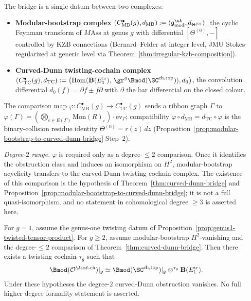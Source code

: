 \begin{remark}
\label{rem:curved-dunn-complex-bridge}
The bridge is a single datum between two complexes:
\begin{itemize}\setlength\itemsep{2pt}
\item \textbf{Modular-bootstrap complex}
 $(C^\bullet_{\mathrm{MB}}(g), d_{\mathrm{MB}})
 := (\mathfrak{g}^{\cA}_{\mathrm{mod}}, d_{\Theta^{(0)}})$,
 the cyclic Feynman transform of $M\mathrm{Ass}$ at genus $g$ with
 differential $[\Theta^{(0)}, -]$ controlled by KZB connections
 (Bernard--Felder at integer level, JMU
 Stokes-regularized at generic level via
 Theorem~\ref{thm:irregular-kzb-composition}).
\item \textbf{Curved-Dunn twisting-cochain complex}
 $(C^\bullet_{\mathrm{TC}}(g), d_{\mathrm{TC}})
 := \bigl(\mathrm{Hom}(\mathbf{B}(E_1^{\mathrm{tr}}),\,
 \gr^g \Bmod(\SC^{\mathrm{ch,top}})), d_0\bigr)$,
 the convolution differential $d_0(f) = \partial f \pm f \partial$
 with $\partial$ the bar differential on the closed colour.
\end{itemize}
The comparison map
$\varphi\colon C^\bullet_{\mathrm{MB}}(g) \to C^\bullet_{\mathrm{TC}}(g)$
sends a ribbon graph $\Gamma$ to
$\varphi(\Gamma) = (\bigotimes_{e\in E(\Gamma)} \mathrm{Mon}(R)_e)
\cdot \mathrm{ev}_\Gamma$; compatibility
$\varphi \circ d_{\mathrm{MB}} = d_{\mathrm{TC}} \circ \varphi$ is the
binary-collision residue identity $\Theta^{(0)} = r(z)\,dz$
(Proposition~\ref{prop:modular-bootstrap-to-curved-dunn-bridge}
Step~2).

\emph{Degree-\(2\) range.} $\varphi$ is required only as a
degree-\(\le2\) comparison. Once it identifies the obstruction class and induces an
isomorphism on \(H^2\), modular-bootstrap acyclicity transfers to
the curved-Dunn twisting-cochain complex. The existence of this
comparison is the hypothesis of
Theorem~\ref{thm:curved-dunn-bridge} and
Proposition~\ref{prop:modular-bootstrap-to-curved-dunn-bridge};
it is not a full quasi-isomorphism, and no statement
in cohomological degree \(\ge3\) is asserted here.
\end{remark}

\begin{corollary}
\label{cor:curved-dunn-all-genera}

For \(g=1\), assume the genus-one twisting datum of
Proposition~\ref{prop:genus1-twisted-tensor-product}. For
\(g\ge2\), assume modular-bootstrap \(H^2\)-vanishing and the
degree-\(\le2\) comparison of
Theorem~\ref{thm:curved-dunn-bridge}. Then there exists a twisting
cochain $\tau_g$ such that
\[
\Bmod(\mathcal{O}^{\Ainf\text{-ch}})|_g \simeq
\Bmod(\SC^{\mathrm{ch,top}})|_g \otimes^{\tau_g}
\mathbf{B}(E_1^{\mathrm{tr}}).
\]
Under these hypotheses the degree-\(2\) curved-Dunn obstruction
vanishes. No full higher-degree formality statement is asserted.
\end{corollary}

